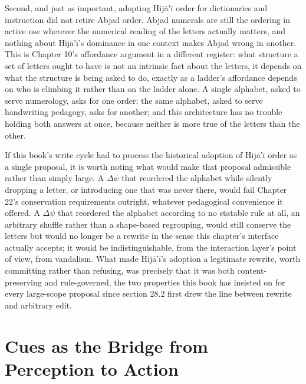 Second, and just as important, adopting Hijā'ī order for dictionaries and instruction did not retire Abjad order. Abjad numerals are still the ordering in active use wherever the numerical reading of the letters actually matters, and nothing about Hijā'ī's dominance in one context makes Abjad wrong in another. This is Chapter 10's affordance argument in a different register: what structure a set of letters ought to have is not an intrinsic fact about the letters, it depends on what the structure is being asked to do, exactly as a ladder's affordance depends on who is climbing it rather than on the ladder alone. A single alphabet, asked to serve numerology, asks for one order; the same alphabet, asked to serve handwriting pedagogy, asks for another; and this architecture has no trouble holding both answers at once, because neither is more true of the letters than the other.

If this book's write cycle had to process the historical adoption of Hijā'ī order as a single proposal, it is worth noting what would make that proposal admissible rather than simply large. A \(\Delta\psi\) that reordered the alphabet while silently dropping a letter, or introducing one that was never there, would fail Chapter 22's conservation requirements outright, whatever pedagogical convenience it offered. A \(\Delta\psi\) that reordered the alphabet according to no statable rule at all, an arbitrary shuffle rather than a shape-based regrouping, would still conserve the letters but would no longer be a rewrite in the sense this chapter's interface actually accepts; it would be indistinguishable, from the interaction layer's point of view, from vandalism. What made Hijā'ī's adoption a legitimate rewrite, worth committing rather than refusing, was precisely that it was both content-preserving and rule-governed, the two properties this book has insisted on for every large-scope proposal since section 28.2 first drew the line between rewrite and arbitrary edit.

\section{Cues as the Bridge from Perception to Action}

